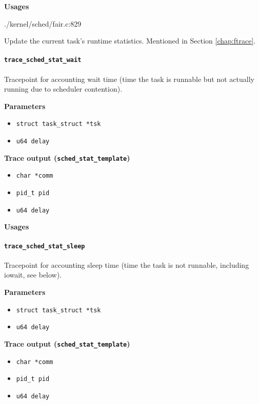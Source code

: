 \textbf{Usages}
\begin{code}
./kernel/sched/fair.c:829
\end{code}

Update the current task's runtime statistics.
Mentioned in Section \ref{chap:ftrace}.

\paragraph{\texttt{trace\_sched\_stat\_wait}}
Tracepoint for accounting wait time (time the task is runnable but not actually running due to scheduler contention).

\textbf{Parameters}
\begin{itemize}
    \item \verb|struct task_struct *tsk|
    \item \verb|u64 delay|
\end{itemize}

\textbf{Trace output (\texttt{sched\_stat\_template})}
\begin{itemize}
    \item \verb|char *comm|
    \item \verb|pid_t pid|
    \item \verb|u64 delay|
\end{itemize}

\textbf{Usages}
\begin{code}

\end{code}

\paragraph{\texttt{trace\_sched\_stat\_sleep}}
Tracepoint for accounting sleep time (time the task is not runnable, including iowait, see below).

\textbf{Parameters}
\begin{itemize}
    \item \verb|struct task_struct *tsk|
    \item \verb|u64 delay|
\end{itemize}

\textbf{Trace output (\texttt{sched\_stat\_template})}
\begin{itemize}
    \item \verb|char *comm|
    \item \verb|pid_t pid|
    \item \verb|u64 delay|
\end{itemize}

